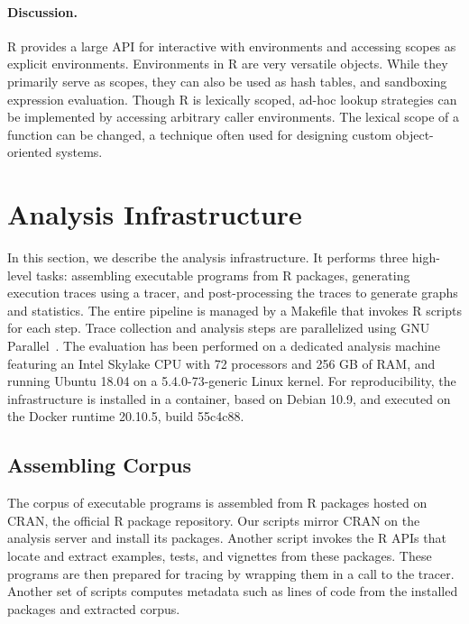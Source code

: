 \documentclass[10pt,review,sigplan,anonymous=true,authorversion=true,nonacm=true]{acmart}
\begin{document}
\paragraph{Discussion.} R provides a large API for interactive with environments
and accessing scopes as explicit environments. Environments in R are very
versatile objects. While they primarily serve as scopes, they can also be used
as hash tables, and sandboxing expression evaluation. Though R is lexically
scoped, ad-hoc lookup strategies can be implemented by accessing arbitrary
caller environments. The lexical scope of a function can be changed, a technique
often used for designing custom object-oriented systems.

\section{Analysis Infrastructure}
In this section, we describe the analysis infrastructure. It performs three
high-level tasks: assembling executable programs from R packages, generating
execution traces using a tracer, and post-processing the traces to generate
graphs and statistics. The entire pipeline is managed by a Makefile that invokes
R scripts for each step. Trace collection and analysis steps are parallelized
using GNU Parallel~\cite{gnuparallel}. The evaluation has been performed on a
dedicated analysis machine featuring an Intel Skylake CPU with 72 processors and
256 GB of RAM, and running Ubuntu 18.04 on a 5.4.0-73-generic Linux kernel. For
reproducibility, the infrastructure is installed in a container, based on Debian
10.9, and executed on the Docker runtime 20.10.5, build 55c4c88.

\subsection{Assembling Corpus}
The corpus of executable programs is assembled from R packages hosted on CRAN,
the official R package repository. Our scripts mirror CRAN on the analysis
server and install its packages. Another script invokes the R APIs that
locate and extract examples, tests, and vignettes from these packages. These
programs are then prepared for tracing by wrapping them in a call to the tracer.
Another set of scripts computes metadata such as lines of code from the
installed packages and extracted corpus.
\end{document}
